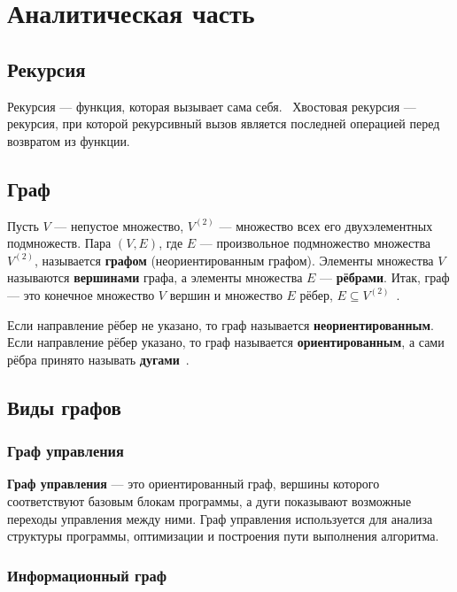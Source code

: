 \chapter{Аналитическая часть}

\section{Рекурсия}

Рекурсия --- функция, которая вызывает сама себя.~\cite{recursion_def}  
Хвостовая рекурсия --- рекурсия, при которой рекурсивный вызов является последней операцией перед возвратом из функции.~\cite{tail_recursion}

\section{Граф}

Пусть \( V \) --- непустое множество, \( V^{(2)} \) --- множество всех его двухэлементных подмножеств. Пара \( (V, E) \), где \( E \) --- произвольное подмножество множества \( V^{(2)} \), называется \textbf{графом} (неориентированным графом). Элементы множества \( V \) называются \textbf{вершинами} графа, а элементы множества \( E \) --- \textbf{рёбрами}. Итак, граф --- это конечное множество \( V \) вершин и множество \( E \) рёбер, \( E \subseteq V^{(2)} \)~\cite{graph_def}.

Если направление рёбер не указано, то граф называется \textbf{неориентированным}. Если направление рёбер указано, то граф называется \textbf{ориентированным}, а сами рёбра принято называть \textbf{дугами}~\cite{graph_def}.

\section{Виды графов}

\subsection{Граф управления}

\textbf{Граф управления} --- это ориентированный граф, вершины которого соответствуют базовым блокам программы, а дуги показывают возможные переходы управления между ними.  
Граф управления используется для анализа структуры программы, оптимизации и построения пути выполнения алгоритма.

\subsection{Информационный граф}

